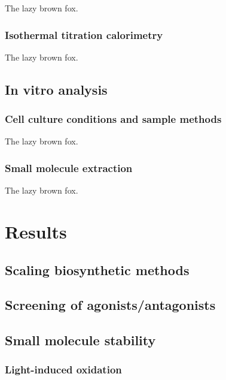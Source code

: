 \begin{refsection}
The lazy brown fox.

\subsubsection{Isothermal titration calorimetry}

The lazy brown fox.

\subsection{In vitro analysis}

\subsubsection{Cell culture conditions and sample methods}

The lazy brown fox.

\subsubsection{Small molecule extraction}

The lazy brown fox.

\section{Results}

\subsection{Scaling biosynthetic methods}

\subsection{Screening of agonists/antagonists}

\subsection{Small molecule stability}

\subsubsection{Light-induced oxidation}

\subsubsection{}



\end{refsection}
